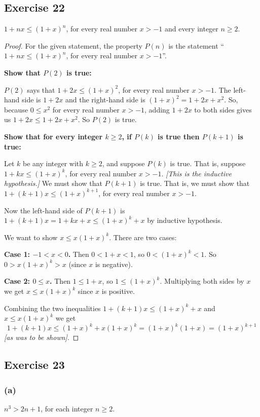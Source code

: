 \documentclass[14pt]{extarticle}
\begin{document}
\subsection{Exercise 22}
$1 + nx \leq (1 + x)^n$, for every real number $x > -1$
and every integer $n \geq 2$.

\begin{proof}
For the given statement, the property $P(n)$ is the statement ``$1 + nx \leq (1 + x)^n$, for every real number $x > -1$''. 

{\bf Show that $P(2)$ is true:} 

$P(2)$ says that $1 + 2x \leq (1 + x)^2$, for every real number $x > -1$. The left-hand side is $1 + 2x$ and the right-hand side is $(1+x)^2 = 1 + 2x + x^2$. So, because $0 \leq x^2$ for every real number $x > -1$, adding $1 + 2x$ to both sides gives us $1 + 2x \leq 1 + 2x + x^2$. So $P(2)$ is true. 

{\bf Show that for every integer $k \geq 2$, if $P(k)$ is true then $P(k + 1)$ is true:} 

Let $k$ be any integer with $k \geq 2$, and suppose $P(k)$ is true. That is, suppose $1 + kx \leq (1 + x)^k$, for every real number $x > -1$. {\it [This is the inductive hypothesis.]} We must show that $P(k + 1)$ is true. That is, we must show that $1 + (k + 1)x \leq (1 + x)^{k + 1}$, for every real number $x > -1$. 

Now the left-hand side of $P(k+1)$ is $1 + (k + 1)x = 1 + kx + x \leq (1 + x)^k + x$ by inductive hypothesis. 

We want to show $x \leq x(1+x)^k$. There are two cases:

{\bf Case 1: $-1 < x < 0$.} Then $0 < 1 + x < 1$, so $0 < (1+x)^k < 1$. So $0 > x(1+x)^k > x$ (since $x$ is negative).

{\bf Case 2: $0 \leq x$.} Then $1 \leq 1+x$, so $1 \leq (1 + x)^k$. Multiplying both sides by $x$ we get $x \leq x(1 + x)^k$ since $x$ is positive.

Combining the two inequalities $1 + (k + 1)x \leq (1 + x)^k + x$ and $x \leq x(1 + x)^k$ we get 
\[
1 + (k + 1)x \leq (1 + x)^k + x(1 + x)^k = (1 + x)^k (1 + x) = (1 + x)^{k + 1}
\]
{\it [as was to be shown]}.
\end{proof}

\subsection{Exercise 23}

\subsubsection{(a)}
$n^3 > 2n + 1$, for each integer $n \geq 2$.
\end{document}
